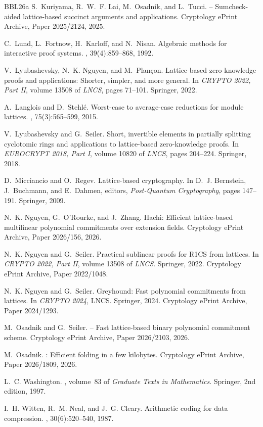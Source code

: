 \begin{thebibliography}{BBL{\etalchar{+}}26a}
S.~Kuriyama, R.~W.~F. Lai, M.~Osadnik, and L.~Tucci.
 -- Sumcheck-aided lattice-based succinct arguments and applications.
\newblock Cryptology ePrint Archive, Paper 2025/2124, 2025.

C.~Lund, L.~Fortnow, H.~Karloff, and N.~Nisan.
\newblock Algebraic methods for interactive proof systems.
, 39(4):859--868, 1992.

V.~Lyubashevsky, N.~K. Nguyen, and M.~Plan{\c{c}}on.
\newblock Lattice-based zero-knowledge proofs and applications: Shorter, simpler, and more general.
\newblock In {\em CRYPTO 2022, Part II}, volume 13508 of {\em LNCS}, pages 71--101. Springer, 2022.

A.~Langlois and D.~Stehl{\'e}.
\newblock Worst-case to average-case reductions for module lattices.
, 75(3):565--599, 2015.

V.~Lyubashevsky and G.~Seiler.
\newblock Short, invertible elements in partially splitting cyclotomic rings and applications to lattice-based zero-knowledge proofs.
\newblock In {\em EUROCRYPT 2018, Part I}, volume 10820 of {\em LNCS}, pages 204--224. Springer, 2018.

D.~Micciancio and O.~Regev.
\newblock Lattice-based cryptography.
\newblock In D.~J. Bernstein, J.~Buchmann, and E.~Dahmen, editors, {\em Post-Quantum Cryptography}, pages 147--191. Springer, 2009.

N.~K. Nguyen, G.~O'Rourke, and J.~Zhang.
\newblock Hachi: Efficient lattice-based multilinear polynomial commitments over extension fields.
\newblock Cryptology ePrint Archive, Paper 2026/156, 2026.

N.~K. Nguyen and G.~Seiler.
\newblock Practical sublinear proofs for {R1CS} from lattices.
\newblock In {\em CRYPTO 2022, Part II}, volume 13508 of {\em LNCS}. Springer, 2022.
\newblock Cryptology ePrint Archive, Paper 2022/1048.

N.~K. Nguyen and G.~Seiler.
\newblock Greyhound: Fast polynomial commitments from lattices.
\newblock In {\em CRYPTO 2024}, LNCS. Springer, 2024.
\newblock Cryptology ePrint Archive, Paper 2024/1293.

M.~Osadnik and G.~Seiler.
 -- Fast lattice-based binary polynomial commitment scheme.
\newblock Cryptology ePrint Archive, Paper 2026/2103, 2026.

M.~Osadnik.
: Efficient folding in a few kilobytes.
\newblock Cryptology ePrint Archive, Paper 2026/1809, 2026.

L.~C. Washington.
, volume~83 of {\em Graduate Texts in Mathematics}.
\newblock Springer, 2nd edition, 1997.

I.~H. Witten, R.~M. Neal, and J.~G. Cleary.
\newblock Arithmetic coding for data compression.
, 30(6):520--540, 1987.

\end{thebibliography}
